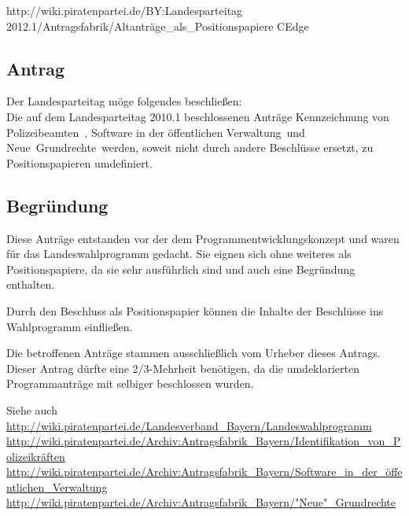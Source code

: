 {http://wiki.piratenpartei.de/BY:Landesparteitag 2012.1/Antragsfabrik/Altanträge_als_Positionspapiere}
{CEdge}
\subsection{Antrag}
Der Landesparteitag möge folgendes beschließen:\\
Die auf dem Landesparteitag 2010.1 beschlossenen Anträge \glqq Kennzeichnung von Polizeibeamten\grqq\ ,
\glqq Software in der öffentlichen Verwaltung\grqq\  und \glqq \glqq Neue\grqq\  Grundrechte\grqq\  werden, soweit nicht durch
andere Beschlüsse ersetzt, zu Positionspapieren umdefiniert.

\subsection{Begründung}
Diese Anträge entstanden vor der dem Programmentwicklungskonzept und waren für das
Landeswahlprogramm gedacht. Sie eignen sich ohne weiteres als Positionspapiere, da sie sehr
ausführlich sind und auch eine Begründung enthalten.\par
Durch den Beschluss als Positionspapier können die Inhalte der Beschlüsse ins Wahlprogramm
einfließen.\par
Die betroffenen Anträge stammen ausschließlich vom Urheber dieses Antrags. Dieser Antrag dürfte
eine 2/3-Mehrheit benötigen, da die umdeklarierten Programmanträge mit selbiger beschlossen
wurden.\par
Siehe auch\\
\url{http://wiki.piratenpartei.de/Landesverband_Bayern/Landeswahlprogramm}\\
\url{http://wiki.piratenpartei.de/Archiv:Antragsfabrik_Bayern/Identifikation_von_Polizeikräften}\\
\url{http://wiki.piratenpartei.de/Archiv:Antragsfabrik_Bayern/Software_in_der_öffentlichen_Verwaltung}\\
\url{http://wiki.piratenpartei.de/Archiv:Antragsfabrik_Bayern/"Neue"_Grundrechte}

